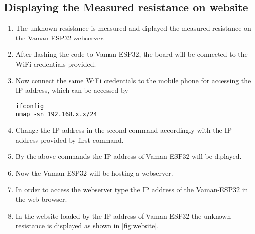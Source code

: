 \subsection{Displaying the Measured resistance on website}
\begin{enumerate}
\item The unknown resistance is measured and diplayed the measured resistance on
the Vaman-ESP32 webserver.
\item After flashing the code to Vaman-ESP32, the board will be connected to the
WiFi credentials provided.
\item Now connect the same WiFi credentials to the mobile phone for accessing
the IP address, which can be accessed by 
\begin{lstlisting}
ifconfig
nmap -sn 192.168.x.x/24
\end{lstlisting}
\item Change the IP address in the second command accordingly with the IP
address provided by first command.
\item By the above commands the IP address of Vaman-ESP32 will be diplayed.
\item Now the Vaman-ESP32 will be hosting a webserver.
\item In order to access the webserver type the IP address of the Vaman-ESP32 in
the web browser.
\item In the website loaded by the IP address of Vaman-ESP32 the unknown 
resistance is displayed as shown in \autoref{fig:website}.
\end{enumerate}
